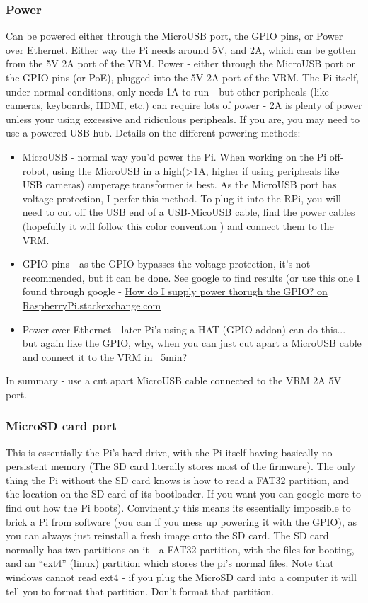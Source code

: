 \documentclass[11pt, titlepage]{article}
\begin{document}
\subsubsection{Power}
\label{sec:WRPI_hardware_power}
Can be powered either through the MicroUSB port, the GPIO pins, or Power over Ethernet. Either way the Pi needs around 5V, and 2A, which can be gotten from the 5V 2A port of the VRM.
Power - either through the MicroUSB port or the GPIO pins (or PoE), plugged into the 5V 2A port of the VRM. The Pi itself, under normal conditions, only needs 1A to run - but other peripheals (like cameras, keyboards, HDMI, etc.) can require lots of power - 2A is plenty of power unless your using excessive and ridiculous peripheals. If you are, you may need to use a powered USB hub.
Details on the different powering methods:
\begin{itemize}
	\item MicroUSB - normal way you'd power the Pi. When working on the Pi off-robot, using the MicroUSB in a high(>1A, higher if using peripheals like USB cameras) amperage transformer is best. As the MicroUSB port has voltage-protection, I perfer this method. To plug it into the RPi, you will need to cut off the USB end of a USB-MicoUSB cable, find the power cables (hopefully it will follow this \href{https://turbofuture.com/computers/Color-Coded-Wire-inside-the-USB}{color convention} ) and connect them to the VRM.
	\item GPIO pins - as the GPIO bypasses the voltage protection, it's not recommended, but it can be done. See google to find results (or use this one I found through google - \href{https://raspberrypi.stackexchange.com/questions/1617/how-do-i-supply-power-through-the-gpio}{How do I supply power thorugh the GPIO? on RaspberryPi.stackexchange.com}
	\item Power over Ethernet - later Pi's using a HAT (GPIO addon) can do this... but again like the GPIO, why, when you can just cut apart a MicroUSB cable and connect it to the VRM in ~5min?
\end{itemize}
In summary - use a cut apart MicroUSB cable connected to the VRM 2A 5V port.
\subsubsection{MicroSD card port}
\label{sec:WRPI_hardware_microSD}
This is essentially the Pi's hard drive, with the Pi itself having basically no persistent memory (The SD card literally stores most of the firmware). The only thing the Pi without the SD card knows is how to read a FAT32 partition, and the location on the SD card of its bootloader. If you want you can google more to find out how the Pi boots).
Convinently this means its essentially impossible to brick a Pi from software (you can if you mess up powering it with the GPIO), as you can always just reinstall a fresh image onto the SD card.
The SD card normally has two partitions on it - a FAT32 partition, with the files for booting, and an ``ext4'' (linux) partition which stores the pi's normal files. Note that windows cannot read ext4 - if you plug the MicroSD card into a computer it will tell you to format that partition. Don't format that partition.
\end{document}

